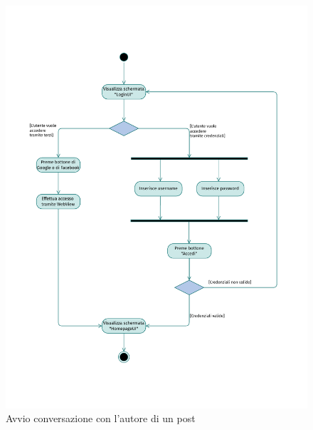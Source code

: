 \documentclass{natourDoc}
\begin{document}
	\newpage
	\begin{figure}[!htbp]
		\centering
		\includegraphics[width=\textwidth, page=14]{./diagrams/activity.pdf}
		\caption{Avvio conversazione con l'autore di un post}
	\end{figure}
	\FloatBarrier
	
\end{document}
